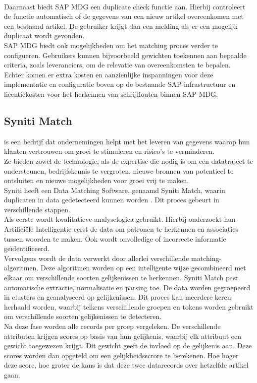 \\Daarnaast biedt SAP MDG een duplicate check functie aan. Hierbij controleert de functie automatisch of de gegevens van een nieuw artikel overeenkomen met een bestaand artikel. De gebruiker krijgt dan een melding als er een mogelijk duplicaat wordt gevonden. 
\\ SAP MDG biedt ook mogelijkheden om het matching proces verder te configueren. Gebruikers kunnen bijvoorbeeld gewichten toekennen aan bepaalde criteria, zoals leveranciers, om de relevatie van overeenkomsten te bepalen.
\\Echter komen er extra kosten en aanzienlijke inspanningen voor deze implementatie en configuratie boven op de bestaande SAP-infrastructuur en licentiekosten voor het herkennen van schrijffouten binnen SAP MDG.

\subsection{Syniti Match}
\textcite{SynitiAbout} is een bedrijf dat ondernemingen helpt met het leveren van gegevens waarop hun klanten vertrouwen om groei te stimuleren en risico's te verminderen.
\\Ze bieden zowel de technologie, als de expertise die nodig is om een datatraject te ondersteunen, bedrijfskennis te vergroten, nieuwe bronnen van potentieel te ontsluiten en nieuwe mogelijkheden voor groei vrij te maken.
\\Syniti heeft een Data Matching Software, genaamd Syniti Match, waarin duplicaten in data gedetecteerd kunnen worden \autocite{SynitiMatch}. Dit proces gebeurt in verschillende stappen. 
\\Als eerste wordt kwalitatieve analyselogica gebruikt. Hierbij onderzoekt hun Artificiële Intelligentie eerst de data om patronen te herkennen en associaties tussen woorden te maken. Ook wordt onvolledige of incorrecte informatie geïdentificeerd. 
\\Vervolgens wordt de data verwerkt door allerlei verschillende matching-algoritmen. Deze algoritmen worden op een intelligente wijze gecombineerd met elkaar om verschillende soorten gelijkenissen te herkennen. Syniti Match past automatische extractie, normalisatie en parsing toe. De data worden gegroepeerd in clusters en geanalyseerd op gelijkenissen. Dit proces kan meerdere keren herhaald worden, waarbij telkens verschillende groepen en tokens worden gebruikt om verschillende soorten gelijkenissen te detecteren. 
\\Na deze fase worden alle records per groep vergeleken. De verschillende attributen krijgen scores op basis van hun gelijkenis, waarbij elk attribuut een gewicht toegewezen krijgt. Dit gewicht geeft de invloed op de gelijkenis aan. Deze scores worden dan opgeteld om een gelijkheidsscrore te berekenen. Hoe hoger deze score, hoe groter de kans is dat deze twee datarecords over hetzelfde artikel gaan. 
